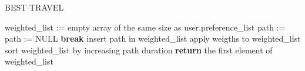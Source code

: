 \begin{algorithm}
\renewcommand\thealgorithm{}
\caption{BEST TRAVEL}
	\begin{algorithmic}[1]
		\State weighted\_list := empty array of the same size as user.preference\_list
			\State path := 
					\State path := NULL
					\State \textbf{break}
				\EndIf
			\EndFor
				\State insert path in weighted\_list
			\EndIf
		\EndFor
		\State apply weigths to weighted\_list
		\State sort weighted\_list by increasing path duration
		\State \textbf{return} the first element of weighted\_list
	\end{algorithmic}
\addtocounter{algorithm}{-1}
\end{algorithm}
